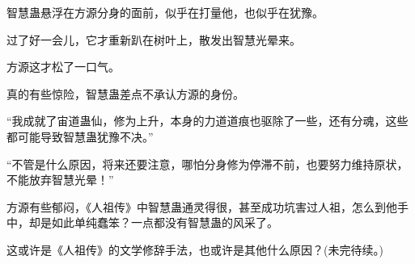 \begin{this_body}
智慧蛊悬浮在方源分身的面前，似乎在打量他，也似乎在犹豫。

过了好一会儿，它才重新趴在树叶上，散发出智慧光晕来。

方源这才松了一口气。

真的有些惊险，智慧蛊差点不承认方源的身份。

“我成就了宙道蛊仙，修为上升，本身的力道道痕也驱除了一些，还有分魂，这些都可能导致智慧蛊犹豫不决。”

“不管是什么原因，将来还要注意，哪怕分身修为停滞不前，也要努力维持原状，不能放弃智慧光晕！”

方源有些郁闷，《人祖传》中智慧蛊通灵得很，甚至成功坑害过人祖，怎么到他手中，却是如此单纯蠢笨？一点都没有智慧蛊的风采了。

这或许是《人祖传》的文学修辞手法，也或许是其他什么原因？(未完待续。)

\end{this_body}

